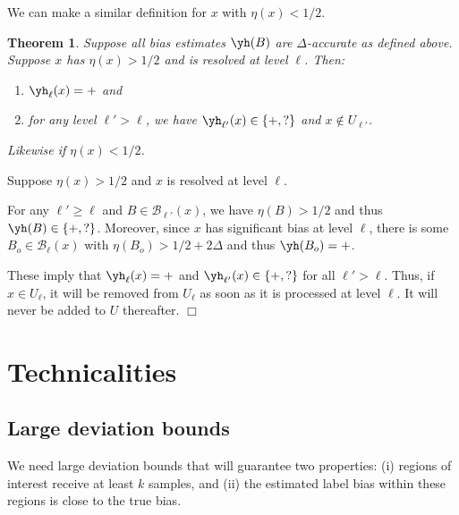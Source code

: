\documentclass{article}
\def\B{{\mathcal B}}
\newtheorem{thm}{Theorem}
\newenvironment{proof}{\noindent {\sc Proof:}}{$\Box$ \medskip}
\begin{document}
We can make a similar definition for $x$ with $\eta(x) < 1/2$.

\begin{thm}
Suppose all bias estimates $\yh(B)$ are $\Delta$-accurate as defined above. Suppose $x$ has $\eta(x) > 1/2$ and is resolved at level $\ell$. Then:
\begin{enumerate}
\item[(a)] $\yh_\ell(x) = +$ and 
\item[(b)] for any level $\ell' > \ell$, we have $\yh_{\ell'}(x) \in \{+, ?\}$ and $x \not\in U_{\ell'}$.
\end{enumerate}
Likewise if $\eta(x) < 1/2$.
\end{thm}

\begin{proof}
Suppose $\eta(x) > 1/2$ and $x$ is resolved at level $\ell$.

For any $\ell' \geq \ell$ and $B \in \B_{\ell'}(x)$, we have $\eta(B) > 1/2$ and thus $\yh(B) \in \{+,?\}$. Moreover, since $x$ has significant bias at level $\ell$, there is some $B_o \in \B_\ell(x)$ with $\eta(B_o) > 1/2 + 2\Delta$ and thus $\yh(B_o) = +$.

These imply that $\yh_\ell(x) = +$ and $\yh_{\ell'}(x) \in \{+,?\}$ for all $\ell' > \ell$. Thus, if $x \in U_\ell$, it will be removed from $U_\ell$ as soon as it is processed at level $\ell$. It will never be added to $U$ thereafter.
\end{proof}


\pagebreak
\appendix

\section{Technicalities}

\subsection{Large deviation bounds}

We need large deviation bounds that will guarantee two properties: (i) regions of interest receive at least $k$ samples, and (ii) the estimated label bias within these regions is close to the true bias.
\end{document}
